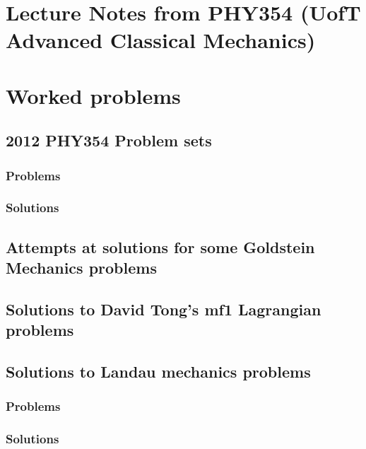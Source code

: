 \part{Lecture Notes from PHY354 (UofT Advanced Classical Mechanics)}
   
   
   
   

\part{Worked problems}
   \chapter{2012 PHY354 Problem sets}
      \section{Problems}
         
      \section{Solutions}
         \shipoutAnswer
   \chapter{Attempts at solutions for some Goldstein Mechanics problems}
      
   \chapter{Solutions to David Tong's mf1 Lagrangian problems}
      
   \chapter{Solutions to Landau mechanics problems}
      \section{Problems}
         
      \section{Solutions}
         \shipoutAnswer

